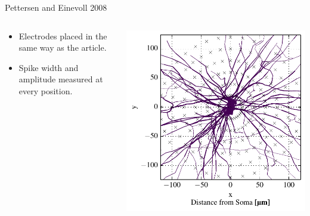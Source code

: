 \documentclass[aspectratio=169]{beamer}
\begin{document}
\begin{frame}{Pettersen and Einevoll 2008}
    \begin{columns}
        \begin{column}{0.48\textwidth}
            \begin{itemize}
                \item Electrodes placed in the same way as the article.
                \item Spike width and amplitude measured at every position.
            \end{itemize}
        \end{column}
        \begin{column}{0.48\textwidth}
            \begin{center}
                \includegraphics[width=\textwidth]{images/disc_morph_elec_xz.pdf}
            \end{center}
        \end{column}
    \end{columns}
\end{frame}
\end{document}
